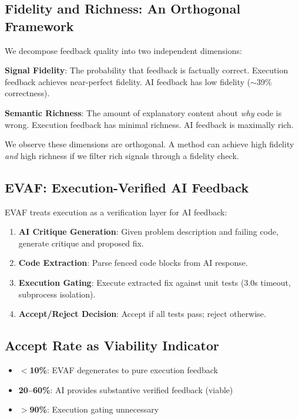 
\subsection{Fidelity and Richness: An Orthogonal Framework}

We decompose feedback quality into two independent dimensions:

\textbf{Signal Fidelity}: The probability that feedback is factually correct. Execution feedback achieves near-perfect fidelity. AI feedback has low fidelity ($\sim$39\% correctness).

\textbf{Semantic Richness}: The amount of explanatory content about \emph{why} code is wrong. Execution feedback has minimal richness. AI feedback is maximally rich.

We observe these dimensions are orthogonal. A method can achieve high fidelity \emph{and} high richness if we filter rich signals through a fidelity check.

\subsection{EVAF: Execution-Verified AI Feedback}

EVAF treats execution as a verification layer for AI feedback:

\begin{enumerate}
    \item \textbf{AI Critique Generation}: Given problem description and failing code, generate critique and proposed fix.
    \item \textbf{Code Extraction}: Parse fenced code blocks from AI response.
    \item \textbf{Execution Gating}: Execute extracted fix against unit tests (3.0s timeout, subprocess isolation).
    \item \textbf{Accept/Reject Decision}: Accept if all tests pass; reject otherwise.
\end{enumerate}

\subsection{Accept Rate as Viability Indicator}

\begin{itemize}
    \item \textbf{$<$10\%}: EVAF degenerates to pure execution feedback
    \item \textbf{20--60\%}: AI provides substantive verified feedback (viable)
    \item \textbf{$>$90\%}: Execution gating unnecessary
\end{itemize}

